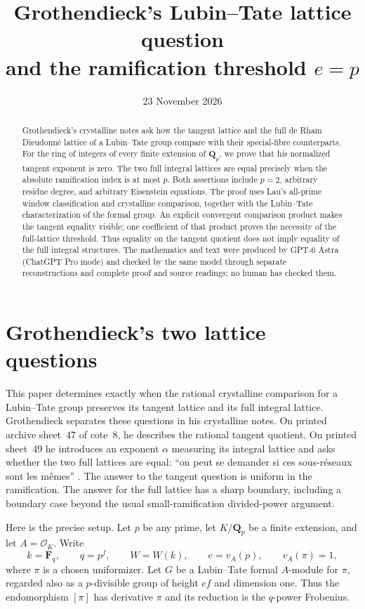\documentclass[11pt]{article}
\title{Grothendieck's Lubin--Tate lattice question\\and the ramification threshold $e=p$}
\author{}
\date{23 November 2026}
\theoremstyle{definition}\newtheorem{definition}[theorem]{Definition}
\theoremstyle{remark}\newtheorem{remark}[theorem]{Remark}
\newcommand{\QQ}{\mathbf Q}
\newcommand{\FF}{\mathbf F}
\newcommand{\OO}{\mathcal O}
\begin{document}
\maketitle

\begin{abstract}
Grothendieck's crystalline notes ask how the tangent lattice and the full de Rham Dieudonn\'e lattice of a Lubin--Tate group compare with their special-fibre counterparts. For the ring of integers of every finite extension of $\QQ_p$, we prove that his normalized tangent exponent is zero. The two full integral lattices are equal precisely when the absolute ramification index is at most $p$. Both assertions include $p=2$, arbitrary residue degree, and arbitrary Eisenstein equations. The proof uses Lau's all-prime window classification and crystalline comparison, together with the Lubin--Tate characterization of the formal group. An explicit convergent comparison product makes the tangent equality visible; one coefficient of that product proves the necessity of the full-lattice threshold. Thus equality on the tangent quotient does not imply equality of the full integral structures. The mathematics and text were produced by GPT-6 Astra (ChatGPT Pro mode) and checked by the same model through separate reconstructions and complete proof and source readings; no human has checked them.
\end{abstract}

\section{Grothendieck's two lattice questions}\label{sec:introduction}

This paper determines exactly when the rational crystalline comparison for a Lubin--Tate group preserves its tangent lattice and its full integral lattice. Grothendieck separates these questions in his crystalline notes. On printed archive sheet~47 of cote~8, he describes the rational tangent quotient. On printed sheet~49 he introduces an exponent $\alpha$ measuring its integral lattice and asks whether the two full lattices are equal: ``on peut se demander si ces sous-r\'eseaux sont les m\^emes'' \citep[cote~8, printed sheets~47 and~49, PDF images~48 and~50]{Grothendieck}. The answer to the tangent question is uniform in the ramification. The answer for the full lattice has a sharp boundary, including a boundary case beyond the usual small-ramification divided-power argument.

Here is the precise setup. Let $p$ be any prime, let $K/\QQ_p$ be a finite extension, and let $A=\OO_K$. Write
\[
 k=\FF_q,\qquad q=p^f,\qquad W=W(k),\qquad
 e=v_A(p),\qquad v_A(\pi)=1,
\]
where $\pi$ is a chosen uniformizer. Let $G$ be a Lubin--Tate formal $A$-module for $\pi$, regarded also as a $p$-divisible group of height $ef$ and dimension one. Thus the endomorphism $[\pi]$ has derivative $\pi$ and its reduction is the $q$-power Frobenius.
\end{document}
